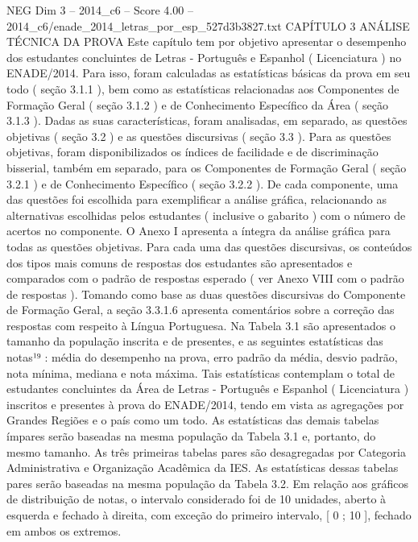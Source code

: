 \begin{textsample}{NEG Dim 3 – 2014\_c6 – Score 4.00 – 2014\_c6/enade\_2014\_letras\_por\_esp\_527d3b3827.txt}  \label{ex:f3_neg_250}
CAPÍTULO 3 ANÁLISE TÉCNICA DA PROVA Este capítulo tem por objetivo apresentar o desempenho dos estudantes concluintes de Letras - Português e Espanhol ( Licenciatura ) no ENADE/2014.
Para isso, foram calculadas as estatísticas básicas da prova em seu todo ( seção 3.1.1 ), bem como as estatísticas relacionadas aos Componentes de Formação Geral ( seção 3.1.2 ) e de Conhecimento Específico da Área ( seção 3.1.3 ).
Dadas as suas características, foram analisadas, em separado, as questões objetivas ( seção 3.2 ) e as questões discursivas ( seção 3.3 ).
Para as questões objetivas, foram disponibilizados os índices de facilidade e de discriminação bisserial, também em separado, para os Componentes de Formação Geral ( seção 3.2.1 ) e de Conhecimento Específico ( seção 3.2.2 ).
De cada componente, uma das questões foi escolhida para exemplificar a análise gráfica, relacionando as alternativas escolhidas pelos estudantes ( inclusive o gabarito ) com o número de acertos no componente.
O Anexo I apresenta a íntegra da análise gráfica para todas as questões objetivas.
Para cada uma das questões discursivas, os conteúdos dos tipos mais comuns de respostas dos estudantes são apresentados e comparados com o padrão de respostas esperado ( ver Anexo VIII com o padrão de respostas ).
Tomando como base as duas questões discursivas do Componente de Formação Geral, a seção 3.3.1.6 apresenta comentários sobre a correção das respostas com respeito à Língua Portuguesa.
Na Tabela 3.1 são apresentados o tamanho da população inscrita e de presentes, e as seguintes estatísticas das notas¹⁹ : média do desempenho na prova, erro padrão da média, desvio padrão, nota mínima, mediana e nota máxima.
Tais estatísticas contemplam o total de estudantes concluintes da Área de Letras - Português e Espanhol ( Licenciatura ) inscritos e presentes à prova do ENADE/2014, tendo em vista as agregações por Grandes Regiões e o país como um todo.
As estatísticas das demais tabelas ímpares serão baseadas na mesma população da Tabela 3.1 e, portanto, do mesmo tamanho.
As três primeiras tabelas pares são desagregadas por Categoria Administrativa e Organização Acadêmica da IES.
As estatísticas dessas tabelas pares serão baseadas na mesma população da Tabela 3.2.
Em relação aos gráficos de distribuição de notas, o intervalo considerado foi de 10 unidades, aberto à esquerda e fechado à direita, com exceção do primeiro intervalo, [ 0 ; 10 ], fechado em ambos os extremos.

\end{textsample}
